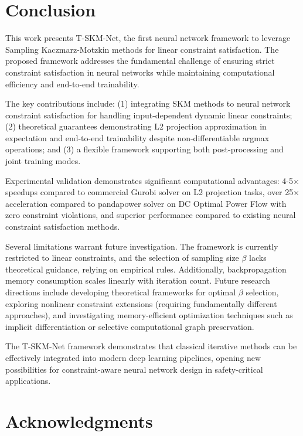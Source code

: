 \documentclass[letterpaper]{article} %
\begin{document}
\section{Conclusion}

This work presents T-SKM-Net, the first neural network framework to leverage Sampling Kaczmarz-Motzkin methods for linear constraint satisfaction. The proposed framework addresses the fundamental challenge of ensuring strict constraint satisfaction in neural networks while maintaining computational efficiency and end-to-end trainability.

The key contributions include: (1) integrating SKM methods to neural network constraint satisfaction for handling input-dependent dynamic linear constraints; (2) theoretical guarantees demonstrating L2 projection approximation in expectation and end-to-end trainability despite non-differentiable argmax operations; and (3) a flexible framework supporting both post-processing and joint training modes.

Experimental validation demonstrates significant computational advantages: 4-5$\times$ speedups compared to commercial Gurobi solver on L2 projection tasks, over 25$\times$ acceleration compared to pandapower solver on DC Optimal Power Flow with zero constraint violations, and superior performance compared to existing neural constraint satisfaction methods.

Several limitations warrant future investigation. The framework is currently restricted to linear constraints, and the selection of sampling size $\beta$ lacks theoretical guidance, relying on empirical rules. Additionally, backpropagation memory consumption scales linearly with iteration count. Future research directions include developing theoretical frameworks for optimal $\beta$ selection, exploring nonlinear constraint extensions (requiring fundamentally different approaches), and investigating memory-efficient optimization techniques such as implicit differentiation or selective computational graph preservation.

The T-SKM-Net framework demonstrates that classical iterative methods can be effectively integrated into modern deep learning pipelines, opening new possibilities for constraint-aware neural network design in safety-critical applications.

\section*{Acknowledgments}
\end{document}
